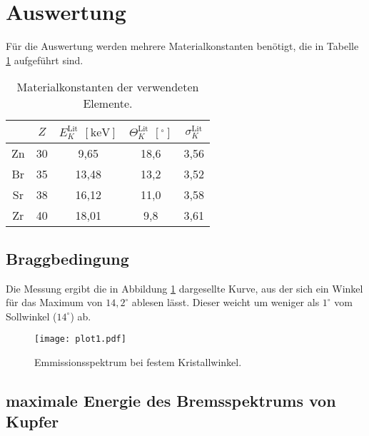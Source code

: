 \section{Auswertung}
\label{sec:Auswertung}

Für die Auswertung werden mehrere Materialkonstanten benötigt, die in Tabelle \ref{tab:material} aufgeführt sind.

\begin{table}
  \centering
  \caption{Materialkonstanten der verwendeten Elemente.}
  \label{tab:material}
  \begin{tabular}{c c c c c}
    \toprule
    & $Z$ & $E^\text{Lit}_K$ $[\si{\kilo\eV}]$ & $\Theta^\text{Lit}_K$ $[^\circ]$ & $\sigma^\text{Lit}_K$ \\
    \midrule
    Zn & 30 & 9,65 & 18,6 & 3,56 \\
    Br & 35 & 13,48 & 13,2 & 3,52 \\
    Sr & 38 & 16,12 & 11,0 & 3,58 \\
    Zr & 40 & 18,01 & 9,8 & 3,61 \\
    \bottomrule
  \end{tabular}
\end{table}

\subsection{Braggbedingung}

Die Messung ergibt die in Abbildung \ref{fig:plot1} dargesellte Kurve, aus der sich ein Winkel für das Maximum von $14,2^\circ$ ablesen lässt.
Dieser weicht um weniger als $1^\circ$ vom Sollwinkel ($14^\circ$) ab.
\begin{figure}
  \centering
  \texttt{[image: plot1.pdf]}
  \caption{Emmissionsspektrum bei festem Kristallwinkel.}
  \label{fig:plot1}
\end{figure}
\FloatBarrier

\subsection{maximale Energie des Bremsspektrums von Kupfer}

